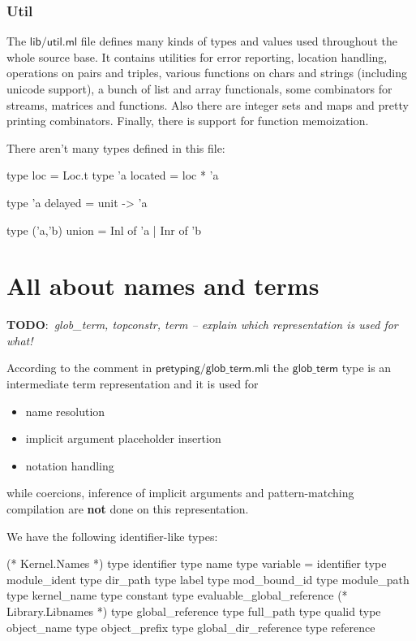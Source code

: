 \documentclass[a4paper,oneside]{book}
\newcommand{\m}[1]{\ensuremath{\mathsf{#1}}}
\newcommand{\TODO}[1]{\textbf{TODO}:\ \emph{#1}}
\begin{document}
\subsection{Util}

The \m{lib/util.ml} file defines many kinds of types and values used
throughout the whole source base. It contains utilities for error
reporting, location handling, operations on pairs and triples, various
functions on chars and strings (including unicode support), a bunch of
list and array functionals, some combinators for streams, matrices and
functions. Also there are integer sets and maps and pretty printing
combinators. Finally, there is support for function memoization.

There aren't many types defined in this file:

\begin{code}
type loc = Loc.t
type 'a located = loc * 'a

type 'a delayed = unit -> 'a

type ('a,'b) union = Inl of 'a | Inr of 'b
\end{code}

\chapter{All about names and terms}

\TODO{glob\_term, topconstr, term -- explain which representation is
  used for what!}

According to the comment in \m{pretyping/glob\_term.mli} the
\m{glob\_term} type is an intermediate term representation and it is
used for
\begin{itemize}
\item name resolution
\item implicit argument placeholder insertion
\item notation handling
\end{itemize}
while coercions, inference of implicit arguments and pattern-matching
compilation are \textbf{not} done on this representation.

We have the following identifier-like types:

\begin{code}
(* Kernel.Names *)
type identifier
type name
type variable = identifier
type module_ident
type dir_path
type label
type mod_bound_id
type module_path
type kernel_name
type constant
type evaluable_global_reference
(* Library.Libnames *)
type global_reference
type full_path
type qualid
type object_name
type object_prefix
type global_dir_reference
type reference    
\end{code}
\end{document}
